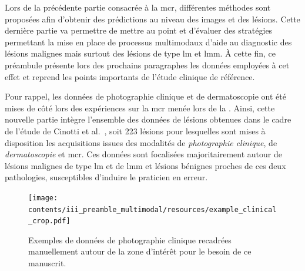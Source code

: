 \renewcommand{\thechapter}{\roman{chapter}}
\setcounter{chapter}{4}
\setcounter{figure}{0}

\label{chap:preamble_multimodal}
Lors de la précédente partie consacrée à la \acrlong{mcr}, différentes méthodes sont proposées afin d'obtenir des prédictions au niveau des images et des lésions. Cette dernière partie va permettre de mettre au point et d'évaluer des stratégies permettant la mise en place de processus multimodaux d'aide au diagnostic des lésions malignes mais surtout des lésions de type \gls{lm} et \gls{lmm}. À cette fin, ce préambule présente lors des prochains paragraphes les données employées à cet effet et reprend les points importants de l'étude clinique de référence.\par

Pour rappel, les données de photographie clinique et de dermatoscopie ont été mises de côté lors des expériences sur la \gls{mcr} menée lors de la . Ainsi, cette nouvelle partie intègre l'ensemble des données de lésions obtenues dans le cadre de l'étude de Cinotti et al.~\cite{Cinotti2018}, soit 223 lésions pour lesquelles sont mises à disposition les acquisitions issues des modalités de \textit{photographie clinique}, de \textit{dermatoscopie} et \gls{mcr}. Ces données sont focalisées majoritairement autour de lésions malignes de type \gls{lm} et de \gls{lmm} et lésions bénignes proches de ces deux pathologies, susceptibles d'induire le praticien en erreur.\par 

\begin{figure}[H]
    \begin{center}
        \texttt{[image: contents/iii\_preamble\_multimodal/resources/example\_clinical\_crop.pdf]}
        \caption{Exemples de données de photographie clinique recadrées manuellement autour de la zone d'intérêt pour le besoin de ce manuscrit.}
        \label{fig:example_clinical_crop}
    \end{center} 
\end{figure}\par
\clearpage

